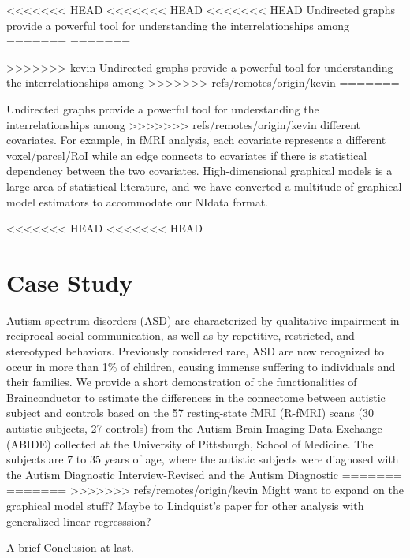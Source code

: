 \documentclass{nature}
\begin{document}
{<<<<<<< HEAD
<<<<<<< HEAD
<<<<<<< HEAD
Undirected graphs provide a powerful tool for understanding the interrelationships among
=======
=======

>>>>>>> kevin
Undirected graphs provide a powerful tool for understanding the
interrelationships among
>>>>>>> refs/remotes/origin/kevin
=======

Undirected graphs provide a powerful tool for understanding the
interrelationships among
>>>>>>> refs/remotes/origin/kevin
different covariates. For example, in fMRI analysis, each covariate represents 
a different voxel/parcel/RoI while an edge connects to covariates if there is
statistical dependency between the two covariates. High-dimensional graphical
models is a large area of statistical literature, and we have converted 
a multitude of graphical model estimators to accommodate our NIdata format.

<<<<<<< HEAD
<<<<<<< HEAD



\section{Case Study}

Autism spectrum disorders (ASD) are characterized by qualitative impairment in reciprocal social communication, as well as by repetitive, restricted, and stereotyped behaviors. Previously considered rare, ASD are now recognized to occur in more than 1\% of children, causing immense suffering to individuals and their families. 
We provide a short demonstration of the functionalities of Brainconductor to
estimate the differences in the connectome between autistic subject and controls based
on the 57 resting-state fMRI (R-fMRI) scans (30 autistic subjects, 27 controls) from the Autism
Brain Imaging Data Exchange (ABIDE) collected at the 
University of Pittsburgh, School of Medicine\cite{di2014autism}. 
The subjects are 7 to 35 years of age, where the autistic subjects were
diagnosed with the Autism Diagnostic Interview-Revised and the Autism Diagnostic 
=======
=======
>>>>>>> refs/remotes/origin/kevin
{\color{red}Might want to expand on the graphical model stuff? Maybe to Lindquist's
paper for other analysis with generalized linear regresssion?}


{\color{red}A brief Conclusion at last.}

}
\end{document}

